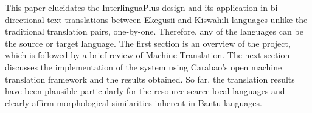 This paper elucidates the InterlinguaPlus design and its application in bi-directional text translations between Ekegusii and Kiswahili languages unlike the traditional translation pairs, one-by-one. Therefore, any of the languages can be the source or target language. The first section is an overview of the project, which is followed by a brief review of Machine Translation. The next section discusses the implementation of the system using Carabao's open machine translation framework and the results obtained. So far, the translation results have been plausible particularly for the resource-scarce local languages and clearly affirm morphological similarities inherent in Bantu languages.
